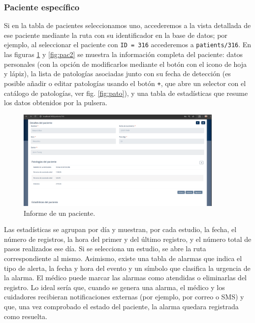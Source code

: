 \documentclass[12pt, a4paper]{article}
\begin{document}
\begin{umaappendices}
	

		\subsubsection{Paciente específico}
		Si en la tabla de pacientes seleccionamos uno, accederemos a la vista detallada de ese paciente mediante la ruta con su identificador en la base de datos; por ejemplo, al seleccionar el paciente con \texttt{ID = 316} accederemos a \texttt{patients/316}. En las figuras \ref{fig:pac1} y \ref{fig:pac2} se muestra la información completa del paciente: datos personales (con la opción de modificarlos mediante el botón con el icono de hoja y lápiz), la lista de patologías asociadas junto con su fecha de detección (es posible añadir o editar patologías usando el botón \texttt{+}, que abre un selector con el catálogo de patologías, ver fig. \ref{fig:pato}), y una tabla de estadísticas que resume los datos obtenidos por la pulsera.
		
		\begin{figure}[htbp]
			\centering
			\includegraphics[width=0.9\textwidth]{images/6_patientID.png}
			\caption[Ejemplo]{Informe de un paciente.}
			\label{fig:pac1}
		\end{figure}
		Las estadísticas se agrupan por día y muestran, por cada estudio, la fecha, el número de registros, la hora del primer y del último registro, y el número total de pasos realizados ese día. Si se selecciona un estudio, se abre la ruta correspondiente al mismo. Asimismo, existe una tabla de alarmas que indica el tipo de alerta, la fecha y hora del evento y un símbolo que clasifica la urgencia de la alarma. El médico puede marcar las alarmas como atendidas o eliminarlas del registro. Lo ideal sería que, cuando se genera una alarma, el médico y los cuidadores recibieran notificaciones externas (por ejemplo, por correo o SMS) y que, una vez comprobado el estado del paciente, la alarma quedara registrada como resuelta.
		

\end{umaappendices}
\end{document}
